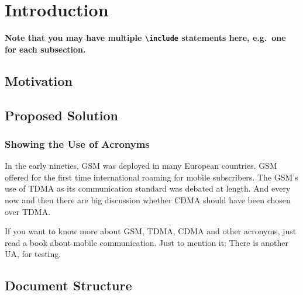 \chapter{Introduction}

\textbf{Note that you may have multiple \texttt{{\textbackslash}include} statements here, e.g.\ one for each subsection.}

\section{Motivation} %
\blindtext

\section{Proposed Solution} 
\blindtext

\subsection{Showing the Use of Acronyms}

In the early nineties, \acs{GSM} was deployed in many European countries. \ac{GSM} offered for the first time international roaming for mobile subscribers. The \acs{GSM}’s use of \ac{TDMA} as its communication standard was debated at length. And every now and then there are big discussion whether \ac{CDMA} should have been chosen over \ac{TDMA}.

If you want to know more about \acf{GSM}, \acf{TDMA}, \acf{CDMA} and other acronyms, just read a book about mobile communication. Just to mention it: There is another \ac{UA}, for testing.


\section{Document Structure}

\blindtext
